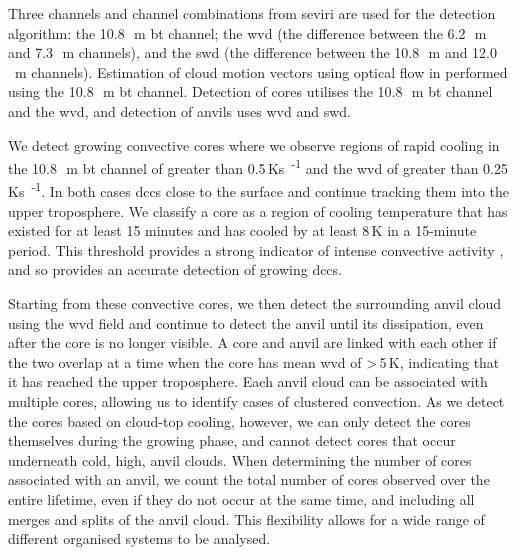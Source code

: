 \documentclass[acp, manuscript]{copernicus}
\begin{document}
Three channels and channel combinations from \acrshort{seviri} are used for the detection algorithm: the 10.8\,\unit{\mu m} \acrshort{bt} channel; the \acrshort{wvd} (the difference between the 6.2\,\unit{\mu m} and 7.3\,\unit{\mu m} channels), and the \acrshort{swd} (the difference between the 10.8\,\unit{\mu m} and 12.0\,\unit{\mu m} channels).
Estimation of cloud motion vectors using optical flow in performed using the 10.8\,\unit{\mu m} \acrshort{bt} channel.
Detection of cores utilises the 10.8\,\unit{\mu m} \acrshort{bt} channel and the \acrshort{wvd}, and detection of anvils uses \acrshort{wvd} and \acrshort{swd}.

We detect growing convective cores where we observe regions of rapid cooling in the 10.8\,\unit{\mu m} \acrshort{bt} channel of greater than 0.5\,\unit{Ks\textsuperscript{-1}} and the \acrshort{wvd} of greater than 0.25\,\unit{Ks\textsuperscript{-1}}.
In both cases
\acrshort{dcc}s close to the surface and continue tracking them into the upper troposphere. 
We classify a core as a region of cooling temperature that has existed for at least 15 minutes and has cooled by at least 8\,\unit{K} in a 15-minute period. 
This threshold provides a strong indicator of intense convective activity \citep{roberts_nowcasting_2003}, and so provides an accurate detection of growing \acrshort{dcc}s.

Starting from these convective cores, we then detect the surrounding anvil cloud using the \acrshort{wvd} field \citep{muller_role_2018, muller_novel_2019} and continue to detect the anvil until its dissipation, even after the core is no longer visible. 
A core and anvil are linked with each other if the two overlap at a time when the core has mean \acrshort{wvd} of \textgreater\,5\,\unit{K}, indicating that it has reached the upper troposphere.
Each anvil cloud can be associated with multiple cores, allowing us to identify cases of clustered convection. 
As we detect the cores based on cloud-top cooling, however, we can only detect the cores themselves during the growing phase, and cannot detect cores that occur underneath cold, high, anvil clouds.
When determining the number of cores associated with an anvil, we count the total number of cores observed over the entire lifetime, even if they do not occur at the same time, and including all merges and splits of the anvil cloud.
This flexibility allows for a wide range of different organised systems to be analysed.
\end{document}
